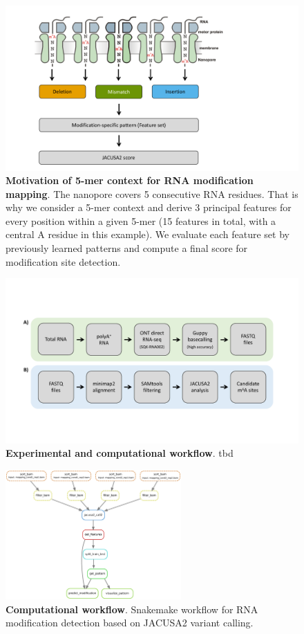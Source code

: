 \documentclass[times, 11pt, a4paper]{article}
\begin{document}
\begin{figure}[h!]
    \includegraphics[width = 1\textwidth]{Figure2.pdf}
  \caption{\textbf{Motivation of 5-mer context for RNA modification mapping}. The nanopore covers 5 consecutive RNA residues. That is why we consider a 5-mer context and derive 3 principal features for every position within a given 5-mer (15 features in total, with a central A residue in this example). We evaluate each feature set by previously learned patterns and compute a final score for modification site detection.}
  \label{fig:5mer}
      \end{figure}
\newpage

\begin{figure}[h!]
    \includegraphics[width = 1\textwidth]{Figure3.pdf}
  \caption{\textbf{Experimental and computational workflow}. tbd}
  \label{fig:workflow}
      \end{figure}
\newpage

\begin{figure}[h!]
	\includegraphics[width = 0.6\textwidth]{img/snakemake.pdf}
	\caption{\textbf{Computational workflow}. Snakemake workflow for RNA modification detection based on JACUSA2 variant calling.}
	\label{fig:snakemake}
\end{figure}
\newpage
\end{document}
